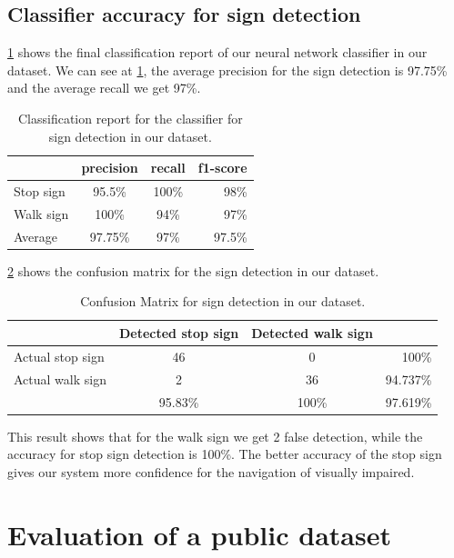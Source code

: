 \subsection{Classifier accuracy for sign detection}

\ref{t:report_walk} shows the final classification report of our neural network classifier in our dataset.
We can see at \ref{t:report_walk}, the average precision for the sign detection is 97.75\% and the average recall we get 97\%.

\begin{table}[h!]
  \centering
  \caption{Classification report for the classifier for sign detection in our dataset.}
  \label{t:report_walk}
  \begin{tabular}{  l  c  c  r }
    \rowcolor{gray!50}
     & precision & recall & f1-score \\
    \hline
    Stop sign & 95.5\% & 100\% & 98\% \\
    Walk sign & 100\% & 94\% & 97\% \\
    \hline  
    Average & 97.75\% & 97\% & 97.5\% \\
  \end{tabular}
\end{table}

\ref{t:walk_sign} shows the confusion matrix for the sign detection in our dataset.

\begin{table}[h!]
  \centering
  \caption{Confusion Matrix for sign detection in our dataset.}
  \label{t:walk_sign}
  \begin{tabular}{  l  c  c  r }
    \rowcolor{gray!50}
     & Detected stop sign & Detected walk sign &  \\
    \hline
    Actual stop sign & 46 & 0 & 100\% \\
    Actual walk sign & 2 & 36 & 94.737\% \\
    \hline
    & 95.83\% & 100\% & 97.619\% \\
    
  \end{tabular}
\end{table}

This result shows that for the walk sign we get 2 false detection, while the accuracy for stop sign detection is 100\%.
The better accuracy of the stop sign gives our system more confidence for the navigation of visually impaired. 

\section{Evaluation of a public dataset}

